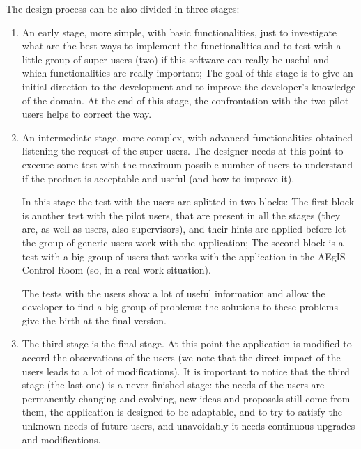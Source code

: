 The design process can be also divided in three stages:

\begin{enumerate}

\item An early stage, more simple, with basic functionalities, just to investigate what are the best ways to implement the functionalities and to test with a little group of super-users (two) if this software can really be useful and which functionalities are really important; The goal of this stage is to give an initial direction to the development and to improve the developer's knowledge of the domain. At the end of this stage, the confrontation with the two pilot users helps to correct the way.

\item An intermediate stage, more complex, with advanced functionalities obtained listening the request of the super users.  
The designer needs at this point to execute some test with the maximum possible number of users to understand if the product is acceptable and useful (and how to improve it). 

In this stage the test with the users are splitted in two blocks:  
The first block is another test with the pilot users, that are present in all the stages (they are, as well as users, also supervisors), and their hints are applied before let the group of generic users work with the application;
The second block is a test with a big group of users that works with the application in the AEgIS Control Room (so, in a real work situation).

The tests with the users show a lot of useful information and allow the developer to find a big group of problems: the solutions to these problems give the birth at the final version. 

\item
The third stage is the final stage. At this point the application is modified to accord the observations of the users (we note that the direct impact of the users leads to a lot of modifications). It is important to notice that the third stage (the last one) is a never-finished stage: the needs of the users are permanently changing and evolving, new ideas and proposals still come from them, the application is designed to be adaptable, and to try to satisfy the unknown needs of future users, and unavoidably it needs continuous upgrades and modifications. 

\end{enumerate}


